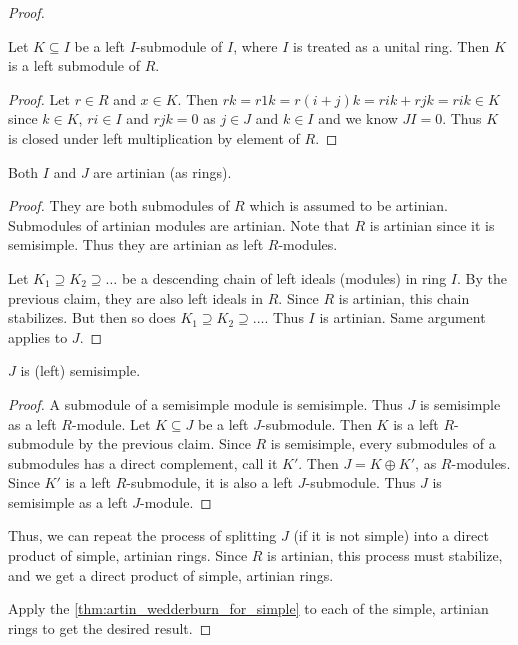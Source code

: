 \begin{proof}
      \begin{claim}
        Let $K \subseteq I$ be a left $I$-submodule of $I$, where $I$ is treated as a unital ring. Then $K$ is a left submodule of $R$.
      \end{claim}
      \begin{proof}
        Let $r \in R$ and $x \in K$. Then $r k = r 1 k = r (i + j) k = r i k + r j k = r i k \in K$ since $k \in K$, $r i \in I$ and $r j k = 0$ as $j \in J$ and $k \in I$ and we know $J I = 0$. Thus $K$ is closed under left multiplication by element of $R$.
      \end{proof}

      \begin{claim}
        Both $I$ and $J$ are artinian (as rings).
      \end{claim}
      \begin{proof}
        They are both submodules of $R$ which is assumed to be artinian. Submodules of artinian modules are artinian. Note that $R$ is artinian since it is semisimple. Thus they are artinian as left $R$-modules.

        Let $K_1 \supseteq K_2 \supseteq \ldots$ be a descending chain of left ideals (modules) in ring $I$. By the previous claim, they are also left ideals in $R$. Since $R$ is artinian, this chain stabilizes. But then so does $K_1 \supseteq K_2 \supseteq \ldots$. Thus $I$ is artinian. Same argument applies to $J$.
      \end{proof}

      \begin{claim}
        $J$ is (left) semisimple.
      \end{claim}
      \begin{proof}
        A submodule of a semisimple module is semisimple. Thus $J$ is semisimple as a left $R$-module. Let $K \subseteq J$ be a left $J$-submodule. Then $K$ is a left $R$-submodule by the previous claim. Since $R$ is semisimple, every submodules of a submodules has a direct complement, call it $K'$. Then $J = K \oplus K'$, as $R$-modules. Since $K'$ is a left $R$-submodule, it is also a left $J$-submodule. Thus $J$ is semisimple as a left $J$-module.
      \end{proof}

      Thus, we can repeat the process of splitting $J$ (if it is not simple) into a direct product of simple, artinian rings. Since $R$ is artinian, this process must stabilize, and we get a direct product of simple, artinian rings.
      
      Apply the \ref{thm:artin_wedderburn_for_simple} to each of the simple, artinian rings to get the desired result.
    \end{proof}